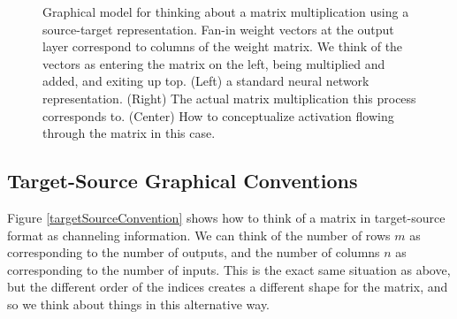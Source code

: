 \begin{figure}[h]
\centering
{}
\caption[Jeff Yoshimi.]{Graphical model for thinking about a matrix multiplication using a source-target representation. Fan-in weight vectors at the output layer correspond to columns of the weight matrix. We think of the vectors as entering the matrix on the left, being multiplied and added, and exiting up top. (Left) a standard neural network representation. (Right) The actual matrix multiplication this process corresponds to. (Center) How to conceptualize activation flowing through the matrix in this case. }
\label{sourceTargetConvention}
\end{figure}


\subsection{Target-Source Graphical Conventions}

Figure \ref{targetSourceConvention} shows how to think of a matrix in target-source format as channeling information. We can think of the number of rows $m$ as corresponding to the number of outputs, and the number of columns $n$ as corresponding to the number of inputs. This is the exact same situation as above, but the different order of the indices creates a different shape for the matrix, and so we  think about things in this alternative way. 



